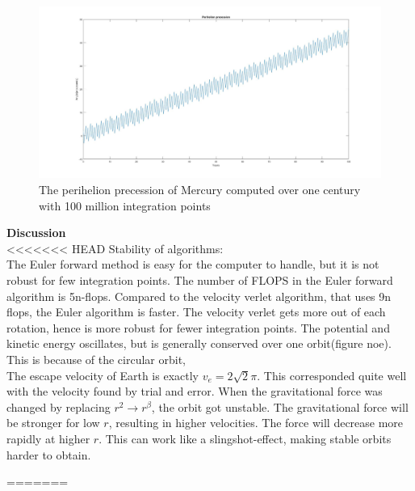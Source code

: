 \documentclass[10pt,a4paper]{article}
\begin{document}
\begin{figure}
\centerline{\includegraphics[scale=0.4]{perihelion100mill.jpg}}
\caption{The perihelion precession of Mercury computed over one century with 100 million integration points}
\end{figure} 

\newpage
{\LARGE\bf
Discussion
}
\\
<<<<<<< HEAD
Stability of algorithms:\\


\noindent The Euler forward method is easy for the computer to handle, but it is not robust for few integration points. The number of FLOPS in the Euler forward algorithm is 5n-flops. Compared to the velocity verlet algorithm, that uses 9n flops, the Euler algorithm is faster. The velocity verlet gets more out of each rotation, hence is more robust for fewer integration points. The potential and kinetic energy oscillates, but is generally conserved over one orbit(figure noe). This is because of the circular orbit,  \\

\noindent The escape velocity of Earth is exactly $v_e=2\sqrt{2}\pi$. This corresponded quite well with the velocity found by trial and error. When the gravitational force was changed by replacing $r^2\rightarrow r^\beta$, the orbit got unstable. The gravitational force will be stronger for low $r$, resulting in higher velocities. The force will decrease more rapidly at higher $r$. This can work like a slingshot-effect, making stable orbits harder to obtain.  

=======
\end{document}
